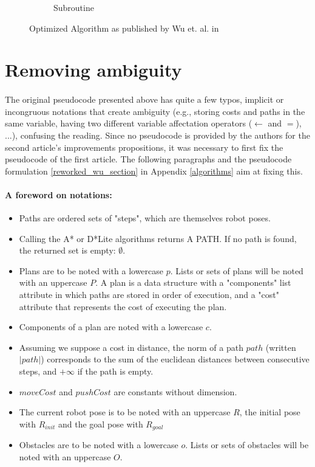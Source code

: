 \begin{figure}[H]
\begin{subfigure}{.45\textwidth}
  \caption{Subroutine}
  \label{fig:Wu_Original_Algorithm-algo4}
\end{subfigure}
\caption{Optimized Algorithm as published by Wu et. al. in \parencite{wu_navigation_2010}}
\label{fig:Wu_Original_Algorithm-optimized}
\end{figure}

\section{Removing ambiguity}
\paragraph{} The original pseudocode presented above has quite a few typos, implicit or incongruous notations that create ambiguity (e.g., storing costs and paths in the same variable, having two different variable affectation operators ($\gets$ and $=$), ...), confusing the reading. Since no pseudocode is provided by the authors for the second article's improvements propositions, it was necessary to first fix the pseudocode of the first article. The following paragraphs and the pseudocode formulation \ref{reworked_wu_section} in Appendix \ref{algorithms} aim at fixing this.

\paragraph{A foreword on notations:}

\begin{itemize}
  \item Paths are ordered sets of "steps", which are themselves robot poses.
  \item Calling the A* or D*Lite algorithms returns A PATH. If no path is found, the returned set is empty: $\emptyset$.
  \item Plans are to be noted with a lowercase $p$. Lists or sets of plans will be noted with an uppercase $P$. A plan is a data structure with a "components" list attribute in which paths are stored in order of execution, and a "cost" attribute that represents the cost of executing the plan.
  \item Components of a plan are noted with a lowercase $c$.
  \item Assuming we suppose a cost in distance, the norm of a path $path$ (written $|path|$) corresponds to the sum of the euclidean distances between consecutive steps, and $+\infty$ if the path is empty.
  \item $moveCost$ and $pushCost$ are constants without dimension.
  \item The current robot pose is to be noted with an uppercase $R$, the initial pose with $R_{init}$ and the goal pose with $R_{goal}$
  \item Obstacles are to be noted with a lowercase $o$. Lists or sets of obstacles will be noted with an uppercase $O$.
\end{itemize}

